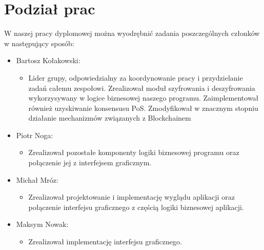 \section{Podział prac}
W naszej pracy dyplomowej można wyodrębnić zadania poszczególnych członków w następujący sposób:
\begin{itemize}
    \item Bartosz Kołakowski:
        \begin{itemize}
            \item Lider grupy, odpowiedzialny za koordynowanie pracy i przydzielanie zadań całemu zespołowi. Zrealizował moduł szyfrowania i deszyfrowania wykorzysywany w logice biznesowej naszego programu. Zaimplementował również uzyskiwanie konsensusu PoS. Zmodyfikował w znacznym stopniu działanie mechanizmów związanych z Blockchainem 
        \end{itemize}
    \item Piotr Noga:
        \begin{itemize}
            \item Zrealizował pozostałe komponenty logiki biznesowej programu oraz połączenie jej z interfejsem graficznym.  
        \end{itemize}
    \item Michał Mróz:
        \begin{itemize}
            \item Zrealizował projektowanie i implementację wyglądu aplikacji oraz połączenie interfejsu graficznego z częścią logiki biznesowej aplikacji.  
        \end{itemize}
    \item Maksym Nowak:
        \begin{itemize}
            \item Zrealizował implementację interfejsu graficznego.  
        \end{itemize}
\end{itemize}